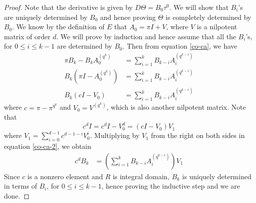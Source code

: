 \documentclass{amsart}
\numberwithin {equation}{section}
\begin{document}
\begin{proof}
Note that the derivative is given by $D\Theta=B_{0}\tau^{0}$. We will show that $B_{i}$'s are uniquely determined by $B_{0}$ and hence proving $\Theta$ is completely determined by $B_{0}$. We know by the definition of $E$ that $A_{0}=\pi I+V$, where $V$ is a nilpotent matrix of order $d$. We will prove by induction and hence assume that all the $B_{i}$'s, for $0\leq i\leq k-1$ are determined by $B_{0}$. Then from equation \eqref{co-ca}, we have
\begin{align}\label{co-ca-2}
\nonumber \pi B_{k}-B_{k}A_{0}^{(q^{k})}&= \displaystyle{\sum_{i=1}^{k}} B_{k-i} A_{i}^{(q^{k-i})}\\
\nonumber B_{k}(\pi I-A_{0}^{(q^{k})})&= \displaystyle{\sum_{i=1}^{k}} B_{k-i} A_{i}^{(q^{k-i})}\\
B_{k}(cI-V_{0})&=\displaystyle{\sum_{i=1}^{k}} B_{k-i} A_{i}^{(q^{k-i})}
\end{align}
where $c=\pi-\pi^{q^{k}}$ and $V_{0}=V^{(q^{k})}$, which is also another nilpotent matrix. Note that $$c^{d}I=c^{d}I-V_{0}^{d}=(cI-V_{0})V_{1}$$ where $V_{1}=\displaystyle{\sum_{i=0}^{d-1}}c^{d-1-i}V_{0}^{i}$. Multiplying by $V_{1}$ from the right on both sides in equation \eqref{co-ca-2}, we obtain
\begin{align}\label{co-ca-3}
c^{d} B_{k}&=\left(\displaystyle{\sum_{i=1}^{k}} B_{k-i} A_{i}^{(q^{k-i})}\right)V_{1}
\end{align}
Since $c$ is a nonzero element and $R$ is integral domain, $B_{k}$ is uniquely determined in terms of $B_{i}$, for $0\leq i\leq k-1$, hence proving the inductive step and we are done. 
\end{proof}
\end{document}
